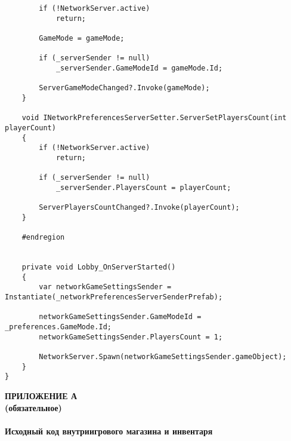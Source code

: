 \begin{lstlisting}
        if (!NetworkServer.active)
            return;

        GameMode = gameMode;

        if (_serverSender != null)
            _serverSender.GameModeId = gameMode.Id;

        ServerGameModeChanged?.Invoke(gameMode);
    }

    void INetworkPreferencesServerSetter.ServerSetPlayersCount(int playerCount)
    {
        if (!NetworkServer.active)
            return;

        if (_serverSender != null)
            _serverSender.PlayersCount = playerCount;

        ServerPlayersCountChanged?.Invoke(playerCount);
    }

    #endregion


    private void Lobby_OnServerStarted()
    {
        var networkGameSettingsSender = Instantiate(_networkPreferencesServerSenderPrefab);

        networkGameSettingsSender.GameModeId = _preferences.GameMode.Id;
        networkGameSettingsSender.PlayersCount = 1;

        NetworkServer.Spawn(networkGameSettingsSender.gameObject);
    }
}
\end{lstlisting}


\newpage
{}
{}
\begin{center}
  \textbf{\MakeUppercase{Приложение А}\\
          (обязательное)\\~\\
          Исходный код внутриигрового магазина и инвентаря}
\end{center}

